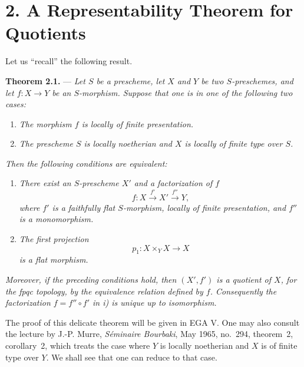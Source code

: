 
%
\section*{2. A Representability Theorem for Quotients}

Let us ``recall'' the following result.

\medskip
\noindent{}%
\textbf{Theorem 2.1.} --- \textit{Let \(S\) be a prescheme, let
\(X\) and \(Y\) be two \(S\)-preschemes, and let
\(f:X\to Y\) be an \(S\)-morphism. Suppose that one is in one of the
following two cases:}

\begin{enumerate}
\renewcommand{\labelenumi}{\textit{\alph{enumi})}}
\item \textit{The morphism \(f\) is locally of finite presentation.}

\item \textit{The prescheme \(S\) is locally noetherian and \(X\) is
locally of finite type over \(S\).}
\end{enumerate}

\noindent\textit{Then the following conditions are equivalent:}

\begin{enumerate}
\renewcommand{\labelenumi}{\textit{\roman{enumi})}}
\item \textit{There exist an \(S\)-prescheme \(X'\) and a
factorization of \(f\)}
\[
  f:X\xrightarrow{\,f'\,}X'\xrightarrow{\,f''\,}Y,
\]
\textit{where \(f'\) is a faithfully flat \(S\)-morphism, locally
of finite presentation, and \(f''\) is a monomorphism.}

\item \textit{The first projection}
\[
  p_1:X\times_Y X\longrightarrow X
\]
\textit{is a flat morphism.}
\end{enumerate}

\noindent\textit{Moreover, if the preceding conditions hold, then
\((X',f')\) is a quotient of \(X\), for the fpqc topology, by the
equivalence relation defined by \(f\). Consequently the
factorization \(f=f''\circ f'\) in i) is unique up to isomorphism.}

The proof of this delicate theorem will be given in EGA V. One may
also consult the lecture by J.-P. Murre, \textit{Séminaire
Bourbaki}, May 1965, no.~294, theorem~2, corollary~2, which treats
the case where \(Y\) is locally noetherian and \(X\) is of finite
type over \(Y\). We shall see that one can reduce to that case.

